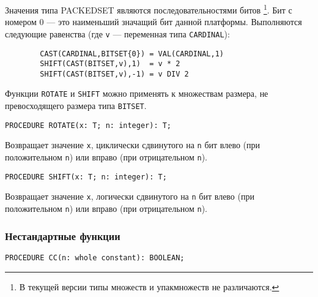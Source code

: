 Значения типа PACKEDSET являются последовательностями битов
\footnote{В текущей версии типы множеств и упакмножеств не различаются.}.
Бит с номером 0 --- это наименьший значащий бит данной платформы.
Выполняются следующие равенства 
(где {\tt v} --- переменная типа {\tt CARDINAL}):
\begin{verbatim}
        CAST(CARDINAL,BITSET{0}) = VAL(CARDINAL,1)
        SHIFT(CAST(BITSET,v),1)  = v * 2
        SHIFT(CAST(BITSET,v),-1) = v DIV 2
\end{verbatim}

Функции {\tt ROTATE} и {\tt SHIFT} можно применять
к множествам размера, не превосходящего размера типа
{\tt BITSET}.

\begin{verbatim}
PROCEDURE ROTATE(x: T; n: integer): T;
\end{verbatim}
Возвращает значение \verb|x|, циклически сдвинутого на \verb|n| 
бит влево (при положительном \verb|n|) 
или вправо (при отрицательном \verb|n|).

\begin{verbatim}
PROCEDURE SHIFT(x: T; n: integer): T;
\end{verbatim}
Возвращает значение \verb|x|, логически сдвинутого на \verb|n| 
бит влево (при положительном \verb|n|) 
или вправо (при отрицательном \verb|n|).

\subsubsection{Нестандартные функции}

\begin{verbatim}
PROCEDURE CC(n: whole constant): BOOLEAN;
\end{verbatim}

